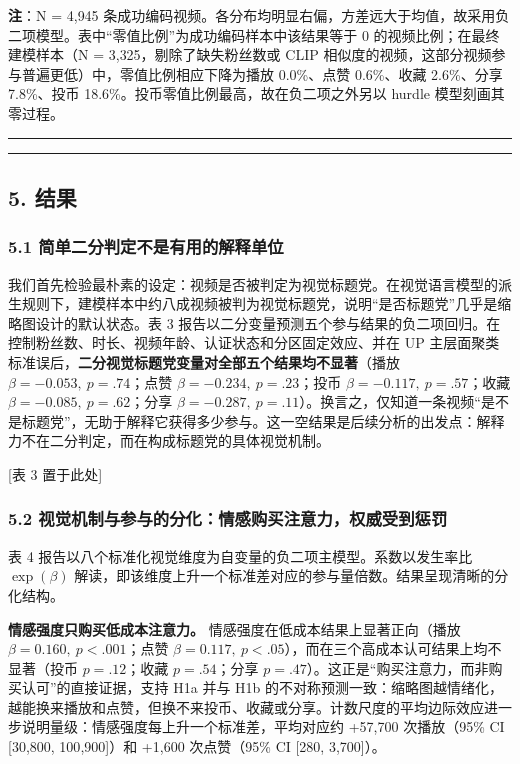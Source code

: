 \documentclass[
  fontset=none]{ctexart}
\begin{document}
\textbf{注}：N = 4{,}945 条成功编码视频。各分布均明显右偏，方差远大于均值，故采用负二项模型。表中``零值比例''为成功编码样本中该结果等于 0 的视频比例；在最终建模样本（N = 3{,}325，剔除了缺失粉丝数或 CLIP 相似度的视频，这部分视频参与普遍更低）中，零值比例相应下降为播放 0.0\%、点赞 0.6\%、收藏 2.6\%、分享 7.8\%、投币 18.6\%。投币零值比例最高，故在负二项之外另以 hurdle 模型刻画其零过程。

\begin{center}\rule{0.5\linewidth}{0.5pt}\end{center}

\begin{center}\rule{0.5\linewidth}{0.5pt}\end{center}

\subsection{5. 结果}\label{ux7ed3ux679c}

\subsubsection{5.1 简单二分判定不是有用的解释单位}\label{ux4e8cux5206}

我们首先检验最朴素的设定：视频是否被判定为视觉标题党。在视觉语言模型的派生规则下，建模样本中约八成视频被判为视觉标题党，说明``是否标题党''几乎是缩略图设计的默认状态。表 3 报告以二分变量预测五个参与结果的负二项回归。在控制粉丝数、时长、视频年龄、认证状态和分区固定效应、并在 UP 主层面聚类标准误后，\textbf{二分视觉标题党变量对全部五个结果均不显著}（播放 \(\beta=-0.053,\ p=.74\)；点赞 \(\beta=-0.234,\ p=.23\)；投币 \(\beta=-0.117,\ p=.57\)；收藏 \(\beta=-0.085,\ p=.62\)；分享 \(\beta=-0.287,\ p=.11\)）。换言之，仅知道一条视频``是不是标题党''，无助于解释它获得多少参与。这一空结果是后续分析的出发点：解释力不在二分判定，而在构成标题党的具体视觉机制。

{[}表 3 置于此处{]}

\subsubsection{5.2 视觉机制与参与的分化：情感购买注意力，权威受到惩罚}\label{ux89c6ux89c9ux673aux5236}

表 4 报告以八个标准化视觉维度为自变量的负二项主模型。系数以发生率比 \(\exp(\beta)\) 解读，即该维度上升一个标准差对应的参与量倍数。结果呈现清晰的分化结构。

\textbf{情感强度只购买低成本注意力。} 情感强度在低成本结果上显著正向（播放 \(\beta=0.160,\ p<.001\)；点赞 \(\beta=0.117,\ p<.05\)），而在三个高成本认可结果上均不显著（投币 \(p=.12\)；收藏 \(p=.54\)；分享 \(p=.47\)）。这正是``购买注意力，而非购买认可''的直接证据，支持 H1a 并与 H1b 的不对称预测一致：缩略图越情绪化，越能换来播放和点赞，但换不来投币、收藏或分享。计数尺度的平均边际效应进一步说明量级：情感强度每上升一个标准差，平均对应约 +57{,}700 次播放（95\% CI [30{,}800, 100{,}900]）和 +1{,}600 次点赞（95\% CI [280, 3{,}700]）。
\end{document}
